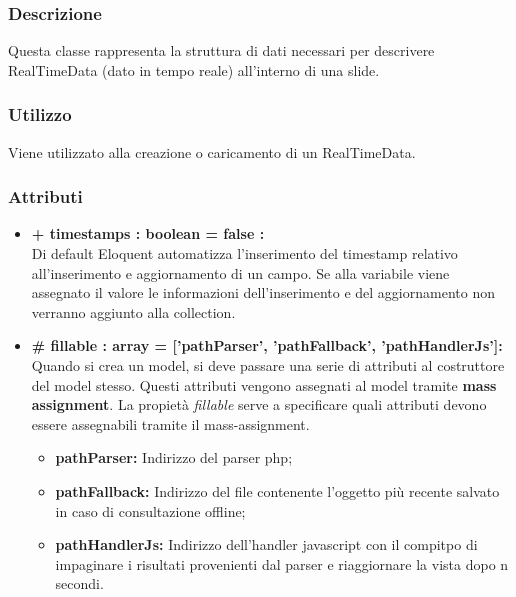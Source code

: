 
	\subsubsection*{Descrizione}
	Questa classe rappresenta la struttura di dati necessari per descrivere RealTimeData (dato in tempo reale) all’interno di una slide.
	
	\subsubsection*{Utilizzo}
	Viene utilizzato alla creazione o caricamento di un RealTimeData.
	
	\subsubsection*{Attributi}
	\begin{itemize}
		\item \textbf{+ timestamps : boolean = false :}\\
		Di default Eloquent automatizza l'inserimento del timestamp relativo all'inserimento e aggiornamento di un campo. Se alla variabile viene assegnato il valore le informazioni dell'inserimento e del aggiornamento non verranno aggiunto alla collection.
		\item \textbf{\# fillable : array = ['pathParser’, ’pathFallback’, ’pathHandlerJs']:}\\
		Quando si crea un model, si deve passare una serie di attributi al costruttore del model stesso. Questi attributi vengono assegnati al model tramite \textbf{mass assignment}. La propietà \textit{fillable} serve a specificare quali attributi devono essere assegnabili tramite il mass-assignment.
		\begin{itemize}
			\item \textbf{pathParser:} Indirizzo del parser php;
			\item \textbf{pathFallback:} Indirizzo del file contenente l'oggetto più recente salvato in caso di consultazione offline;
			\item \textbf{pathHandlerJs:} Indirizzo dell'handler javascript con il compitpo di impaginare i risultati provenienti dal parser e riaggiornare la vista dopo n secondi.
		\end{itemize}
		
	\end{itemize}
	

